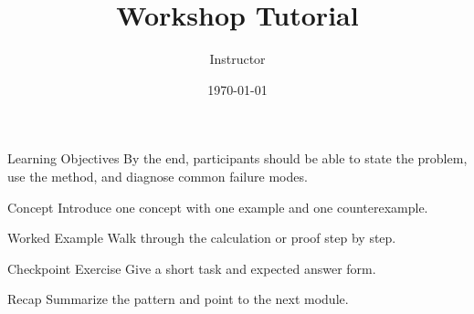 \documentclass[10pt,aspectratio=169]{beamer}
\title{Workshop Tutorial}
\author{Instructor}
\date{\today}
\begin{document}
\begin{frame}\titlepage\end{frame}

\begin{frame}{Learning Objectives}
  By the end, participants should be able to state the problem, use the method,
  and diagnose common failure modes.
\end{frame}

\begin{frame}{Concept}
  Introduce one concept with one example and one counterexample.
\end{frame}

\begin{frame}{Worked Example}
  Walk through the calculation or proof step by step.
\end{frame}

\begin{frame}{Checkpoint Exercise}
  Give a short task and expected answer form.
\end{frame}

\begin{frame}{Recap}
  Summarize the pattern and point to the next module.
\end{frame}
\end{document}
